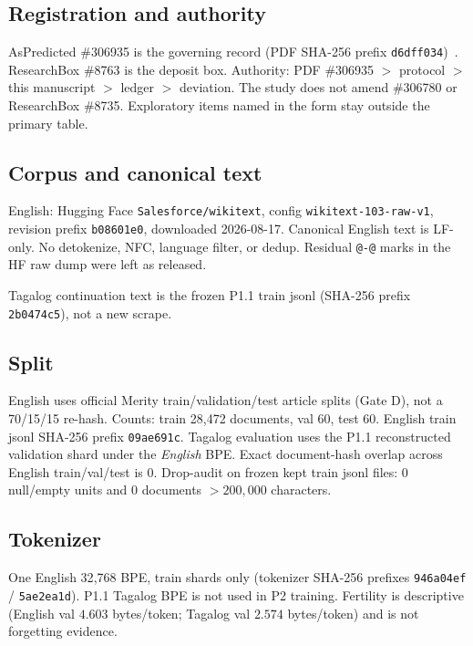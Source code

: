 \documentclass[11pt,a4paper]{article}
\begin{document}
\subsection{Registration and authority}
AsPredicted \#306935 is the governing record (PDF SHA-256 prefix \texttt{d6dff034})~\cite{aspredicted306935}. ResearchBox \#8763 is the deposit box. Authority: PDF \#306935 $>$ protocol $>$ this manuscript $>$ ledger $>$ deviation. The study does not amend \#306780 or ResearchBox \#8735. Exploratory items named in the form stay outside the primary table.

\subsection{Corpus and canonical text}
English: Hugging Face \texttt{Salesforce/wikitext}, config \texttt{wikitext-103-raw-v1}, revision prefix \texttt{b08601e0}, downloaded 2026-08-17. Canonical English text is LF-only. No detokenize, NFC, language filter, or dedup. Residual \texttt{@-@} marks in the HF raw dump were left as released.

Tagalog continuation text is the frozen P1.1 train jsonl (SHA-256 prefix \texttt{2b0474c5}), not a new scrape.

\subsection{Split}
English uses official Merity train/validation/test article splits (Gate D), not a 70/15/15 re-hash. Counts: train 28{,}472 documents, val 60, test 60. English train jsonl SHA-256 prefix \texttt{09ae691c}. Tagalog evaluation uses the P1.1 reconstructed validation shard under the \emph{English} BPE. Exact document-hash overlap across English train/val/test is 0. Drop-audit on frozen kept train jsonl files: 0 null/empty units and 0 documents $>200{,}000$ characters.

\subsection{Tokenizer}
One English 32{,}768 BPE, train shards only (tokenizer SHA-256 prefixes \texttt{946a04ef} / \texttt{5ae2ea1d}). P1.1 Tagalog BPE is not used in P2 training. Fertility is descriptive (English val $4.603$ bytes/token; Tagalog val $2.574$ bytes/token) and is not forgetting evidence.
\end{document}
